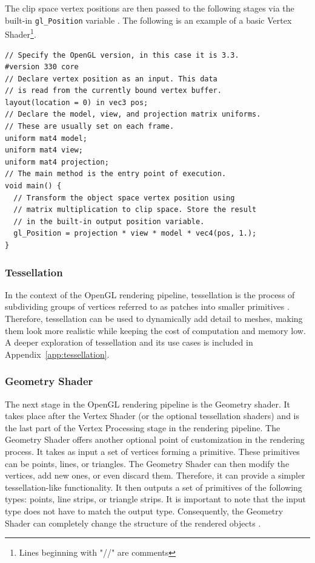\documentclass[
  digital,     %
  oneside,     %
  nosansbold,  %
  nocolorbold, %
  lof,         %
  lot,         %
]{fithesis4}
\begin{document}
The clip space vertex positions are then passed to the following stages via the
built-in \verb|gl_Position| variable \cite{openglwiki-vertex-shader}. The following is an example
of a basic Vertex Shader\footnote{Lines beginning with "//" are comments}.
\pagebreak
\begin{verbatim}
// Specify the OpenGL version, in this case it is 3.3.
#version 330 core
// Declare vertex position as an input. This data
// is read from the currently bound vertex buffer.
layout(location = 0) in vec3 pos;
// Declare the model, view, and projection matrix uniforms.
// These are usually set on each frame.
uniform mat4 model;
uniform mat4 view;
uniform mat4 projection;
// The main method is the entry point of execution.
void main() {
  // Transform the object space vertex position using
  // matrix multiplication to clip space. Store the result
  // in the built-in output position variable.
  gl_Position = projection * view * model * vec4(pos, 1.);
}
\end{verbatim}

\subsubsection{Tessellation}
In the context of the OpenGL rendering pipeline, tessellation is the process of subdividing groups of
vertices referred to as patches into smaller primitives \cite{openglwiki-tessellation}. Therefore, tessellation
can be used to dynamically add detail to meshes, making them look more realistic while keeping
the cost of computation and memory low. A deeper exploration of tessellation and
its use cases is included in Appendix~\ref{app:tessellation}.

\subsubsection{Geometry Shader}
The next stage in the OpenGL rendering pipeline is the Geometry shader. It takes place after the
Vertex Shader (or the optional tessellation shaders) and is the last part of the Vertex Processing
stage in the rendering pipeline. The Geometry Shader offers another optional point of customization
in the rendering process. It takes as input a set of vertices forming a primitive. These primitives can
be points, lines, or triangles. The Geometry Shader can then modify the vertices, add new ones, or
even discard them. Therefore, it can provide a simpler tessellation-like functionality. It then outputs
a set of primitives of the following types: points, line strips, or triangle strips. It is important to note
that the input type does not have to match the output type. Consequently, the Geometry Shader can
completely change the structure of the rendered objects \cite{learnopengl-geometry}\cite{openglwiki-geometry}.
\end{document}
